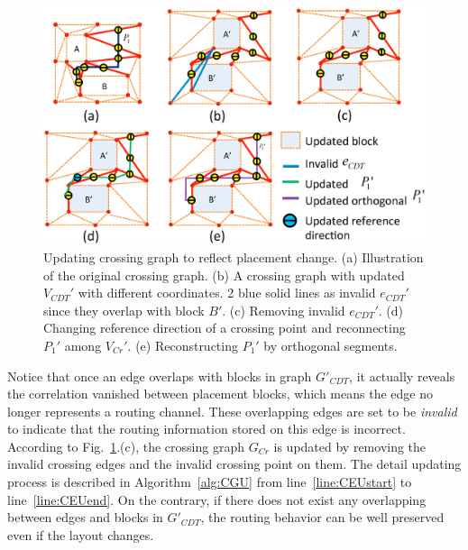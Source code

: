     \begin{figure}[ht]
      \begin{center}
      \includegraphics[width=\textwidth]{Fig/UCG.eps}
      \caption{
        Updating crossing graph to reflect placement change.
        (a) Illustration of the original crossing graph.
        (b) A crossing graph with updated $V_{CDT}'$ with different coordinates. 2 blue solid lines as invalid $e_{CDT}'$ since they overlap with block $B'$.
        (c) Removing invalid $e_{CDT}'$.
        (d) Changing reference direction of a crossing point and reconnecting $P_1'$ among $V_{Cr}'$. 
        (e) Reconstructing $P_1'$ by orthogonal segments.
      }
      \label{fig:CGU}
      \end{center}
    \end{figure}


    Notice that once an edge overlaps with blocks in graph $G'_{CDT}$, it actually reveals the correlation vanished between placement blocks, 
    which means the edge no longer represents a routing channel.
    These overlapping edges are set to be {\it invalid} to indicate that the routing information stored on this edge is incorrect.
    According to Fig.~\ref{fig:CGU}.(c), the crossing graph $G_{Cr}$ is updated by removing the invalid crossing edges and the invalid crossing point on them. The detail updating process is described in Algorithm~\ref{alg:CGU} from line~\ref{line:CEUstart} to line~\ref{line:CEUend}.
    On the contrary, if there does not exist any overlapping between edges and blocks in $G'_{CDT}$, the routing behavior can be well preserved even if the layout changes.

      


